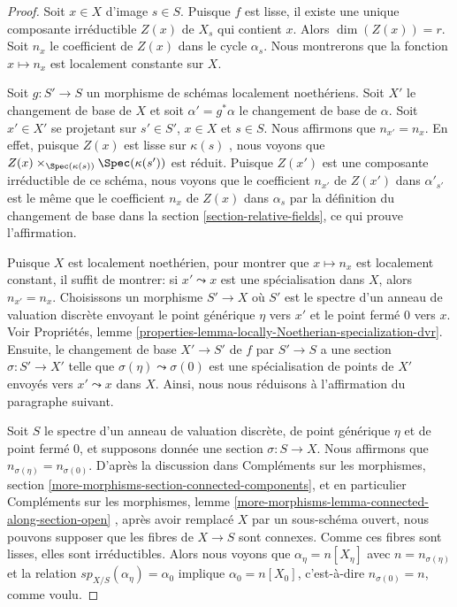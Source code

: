 \begin{proof} 
Soit  $x \in X$  d'image  $s \in S$. Puisque  $f$  est lisse, il existe une
 unique composante irréductible  $Z(x)$  de  $X_s$  qui contient  $x$. 
Alors  $\dim(Z(x)) = r$. 
Soit  $n_x$  le coefficient de $Z(x)$  dans le cycle  $\alpha_s$.
 Nous montrerons que la fonction $x \mapsto n_x$  est localement constante sur  $X$. 

\medskip\noindent
 Soit  $g : S' \to S$  un morphisme de schémas localement noethériens. 
Soit $X'$  le changement de base de  $X$  et soit  $\alpha' = g^*\alpha$
  le changement de base de  $\alpha$. Soit  $x' \in X'$  se projetant sur $s' \in S'$,  
$x \in X$ et  $s \in S$. Nous affirmons que $n_{x'} = n_x$. En effet, puisque  $Z(x)$
  est lisse sur  $\kappa(s)$ , nous voyons que  
$Z(x) \times_{\Spec(\kappa(s))} \Spec(\kappa(s'))$
  est réduit. Puisque  $Z(x')$  est une composante irréductible
 de ce schéma, nous voyons que le coefficient  $n_{x'}$  de  $Z(x')$
  dans  $\alpha'_{s'}$  est le même que le coefficient  $n_x$  de  $Z(x)$
  dans  $\alpha_s$  par la définition du changement de base dans 
la section \ref{section-relative-fields}, 
ce qui prouve l'affirmation. 

\medskip\noindent
 Puisque  $X$  est localement noethérien, pour montrer que  $x \mapsto n_x$
  est localement constant, il suffit de montrer: si  $x' \leadsto x$
  est une spécialisation dans  $X$, alors  $n_{x'} = n_x$.
 Choisissons un morphisme  $S' \to X$  où $S'$  est le spectre d'un anneau de 
valuation discrète envoyant le point générique  $\eta$  vers  $x'$  et le point fermé  
$0$  vers $x$. Voir Propriétés, lemme 
\ref{properties-lemma-locally-Noetherian-specialization-dvr}. Ensuite,
 le changement de base $X' \to S'$  de  $f$  par  $S' \to S$
  a une section  $\sigma : S' \to X'$  telle que $\sigma(\eta) \leadsto \sigma(0)$
  est une spécialisation de points de  $X'$  envoyés vers $x' \leadsto x$  dans  $X$.
 Ainsi, nous nous réduisons à l'affirmation du paragraphe suivant. 

\medskip\noindent
 Soit  $S$  le spectre d'un anneau de valuation discrète, de 
point générique  $\eta$  et de point fermé  $0$, et supposons donnée une section 
$\sigma : S  \to X$. Nous affirmons que $n_{\sigma(\eta)} = n_{\sigma(0)}$.
 D'après la discussion dans Compléments sur les morphismes, section 
\ref{more-morphisms-section-connected-components}, et en particulier Compléments
 sur les morphismes, lemme \ref{more-morphisms-lemma-connected-along-section-open} , après
 avoir remplacé  $X$  par un sous-schéma ouvert, nous pouvons supposer que 
les fibres de  $X \to S$  sont connexes. Comme ces fibres sont
 lisses, elles sont irréductibles. Alors nous voyons que  $\alpha_\eta = n[X_\eta]$
  avec $n = n_{\sigma(\eta)}$  et la relation  $sp_{X/S}(\alpha_\eta) = \alpha_0$
  implique  $\alpha_0 = n[X_0]$, c'est-à-dire $n_{\sigma(0)} = n$, comme voulu. 
\end{proof} 


